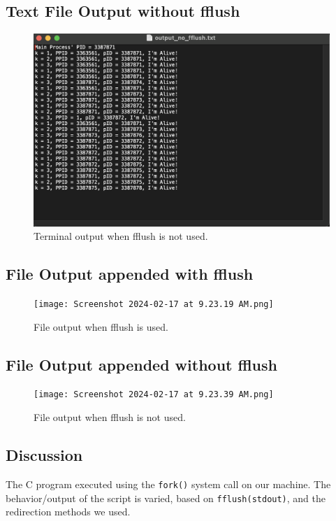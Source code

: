\documentclass[12pt]{article}
\begin{document}
  \subsection{Text File Output without fflush}
  \begin{figure}[h]
    \centering
    \includegraphics[width=17cm]{output_no_fflush.png}
    \caption{Terminal output when fflush is not used.}
  \end{figure}

\newpage
\subsection{File Output appended with fflush}
\begin{figure}[h]
\centering
\texttt{[image: Screenshot 2024-02-17 at 9.23.19 AM.png]}
\caption{File output when fflush is used.}
\end{figure}

\newpage
\subsection{File Output appended without fflush}
\begin{figure}[h]
\centering
\texttt{[image: Screenshot 2024-02-17 at 9.23.39 AM.png]}
\caption{File output when fflush is not used.}
\end{figure}

\newpage
  \subsection{Discussion}
The C program executed using the \texttt{fork()} system call on our machine. The behavior/output of the script is varied, based on \texttt{fflush(stdout)}, and the redirection methods we used. 
\end{document}
